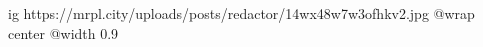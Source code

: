 
 
 
 
 

\ifcmt
  ig https://mrpl.city/uploads/posts/redactor/14wx48w7w3ofhkv2.jpg
  @wrap center
  @width 0.9
\fi
